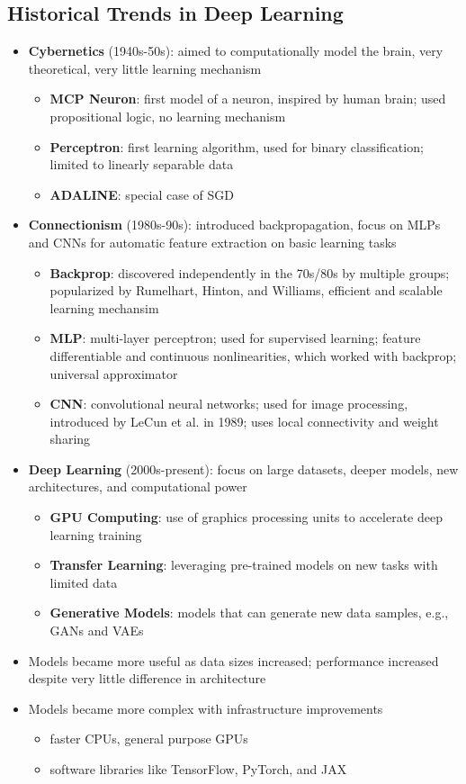 \subsection{Historical Trends in Deep Learning} 
\begin{itemize}
    \item \textbf{Cybernetics} (1940s-50s): aimed to computationally model the brain, very theoretical, very little learning mechanism
    \begin{itemize}
        \item \textbf{MCP Neuron}: first model of a neuron, inspired by human brain; used propositional logic, no learning mechanism
        \item \textbf{Perceptron}: first learning algorithm, used for binary classification; limited to linearly separable data
        \item \textbf{ADALINE}: special case of SGD
    \end{itemize}
    \item \textbf{Connectionism} (1980s-90s): introduced backpropagation, focus on MLPs and CNNs for automatic feature extraction on basic learning tasks
    \begin{itemize}
        \item \textbf{Backprop}: discovered independently in the 70s/80s by multiple groups; popularized by Rumelhart, Hinton, and Williams, efficient and scalable learning mechansim
        \item \textbf{MLP}: multi-layer perceptron; used for supervised learning; feature differentiable and continuous nonlinearities, which worked with backprop; universal approximator
        \item \textbf{CNN}: convolutional neural networks; used for image processing, introduced by LeCun et al. in 1989; uses local connectivity and weight sharing
    \end{itemize}
    \item \textbf{Deep Learning} (2000s-present): focus on large datasets, deeper models, new architectures, and computational power
    \begin{itemize}
        \item \textbf{GPU Computing}: use of graphics processing units to accelerate deep learning training
        \item \textbf{Transfer Learning}: leveraging pre-trained models on new tasks with limited data
        \item \textbf{Generative Models}: models that can generate new data samples, e.g., GANs and VAEs
    \end{itemize}
    \item Models became more useful as data sizes increased; performance increased despite very little difference in architecture
    \item Models became more complex with infrastructure improvements 
    \begin{itemize}
        \item faster CPUs, general purpose GPUs
        \item software libraries like TensorFlow, PyTorch, and JAX
    \end{itemize}
\end{itemize}
